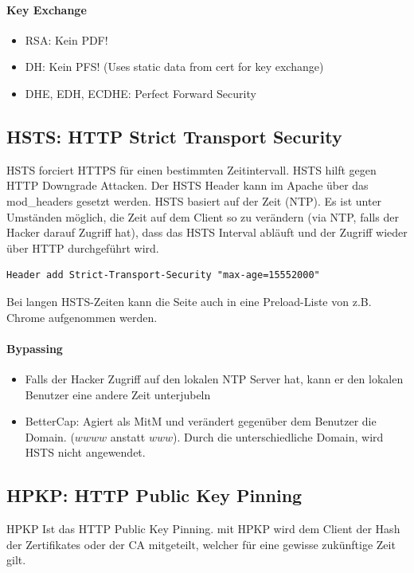 \paragraph{Key Exchange}
\begin{itemize}
	\item RSA: Kein PDF!
	\item DH: Kein PFS! (Uses static data from cert for key exchange)
	\item DHE, EDH, ECDHE: Perfect Forward Security
\end{itemize}

\subsection{HSTS: HTTP Strict Transport Security}
HSTS forciert HTTPS für einen bestimmten Zeitintervall. HSTS hilft gegen HTTP Downgrade Attacken. Der HSTS Header kann im Apache über das mod\_headers gesetzt werden. HSTS basiert auf der Zeit (NTP). Es ist unter Umständen möglich, die Zeit auf dem Client so zu verändern (via NTP, falls der Hacker darauf Zugriff hat), dass das HSTS Interval abläuft und der Zugriff wieder über HTTP durchgeführt wird.
\begin{lstlisting}
Header add Strict-Transport-Security "max-age=15552000"
\end{lstlisting}

Bei langen HSTS-Zeiten kann die Seite auch in eine Preload-Liste von z.B. Chrome aufgenommen werden.

\paragraph{Bypassing}
\begin{itemize}
	\item Falls der Hacker Zugriff auf den lokalen NTP Server hat, kann er den lokalen Benutzer eine andere Zeit unterjubeln
	\item BetterCap: Agiert als MitM und verändert gegenüber dem Benutzer die Domain. ($wwww$ anstatt $www$). Durch die unterschiedliche Domain, wird HSTS nicht angewendet.
\end{itemize}

\subsection{HPKP: HTTP Public Key Pinning}

HPKP Ist das HTTP Public Key Pinning. mit HPKP wird dem Client der Hash der Zertifikates oder der CA mitgeteilt, welcher für eine gewisse zukünftige Zeit gilt.

